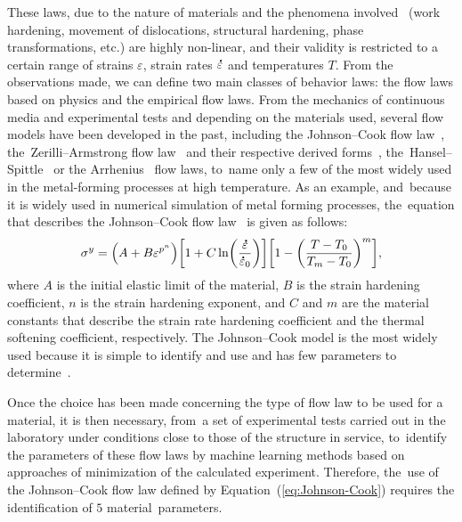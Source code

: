 \documentclass[algorithms,article,accept,pdftex,oneauthors]{Definitions/mdpi}
\DeclareRobustCommand{\mdot}[1]{\accentset{\mbox{\bfseries .}}{#1}}
\begin{document}
These laws, due to the nature of materials and the phenomena involved~\cite{Lennon-2004, Zhang-2012} (work hardening, movement of dislocations, structural hardening, phase transformations, etc.) are highly non-linear, and their validity is restricted to a certain range of strains $\varepsilon$, strain rates $\mdot\varepsilon$ and temperatures $T$.
From the observations made, we can define two main classes of behavior laws: the flow laws based on physics and the empirical flow laws.
From the mechanics of continuous media and experimental tests and depending on the materials used, several flow models have been developed in the past, including the Johnson--Cook flow law~\cite{Johnson-1983, Johnson-1988}, the~Zerilli--Armstrong flow law~\cite{Zerilli-1987} and their respective derived \mbox{forms~\cite{Lin-2011, Li-2013, Zhang-2015, Zhou-2020, Jia-2021, Rule-1998, Lin2010, Muralli-2017, Cheng-2021}}, the~Hansel--Spittle~\cite{Hensel-1978, Chadha-2018} or the Arrhenius~\cite{Jonas-1969, He-2013, Liang-2022} flow laws, to~name only a few of the most widely used in the metal-forming processes at high temperature.
As an example, and~because it is widely used in numerical simulation of metal forming processes, the~equation that describes the Johnson--Cook flow law~\cite{Johnson-1983} is given as follows:
\begin{equation}
\sigma^y=\left(A+B\varepsilon^{p^{n}}\right) \left[1+C\ln\left(\frac{\mdot\varepsilon}{\mdot\varepsilon_0}\right)\right] \left[1-\left(\frac{T-T_0}{T_m-T_0}\right)^{m}\right],\label{eq:Johnson-Cook}
\end{equation}
where $A$ is the initial elastic limit of the material, $B$ is the strain hardening coefficient, $n$ is the strain hardening exponent, and $C$ and $m$ are the material constants that describe the strain rate hardening coefficient and the thermal softening coefficient, respectively.
The Johnson--Cook model is the most widely used because it is simple to identify and use and has few parameters to determine~\cite{NematNasser-2003, Khan-2004}.

Once the choice has been made concerning the type of flow law to be used for a material, it is then necessary, from~a set of experimental tests carried out in the laboratory under conditions close to those of the structure in service, to~identify the parameters of these flow laws by machine learning methods based on approaches of minimization of the calculated experiment.
Therefore, the~use of the Johnson--Cook flow law defined by Equation~(\ref{eq:Johnson-Cook}) requires the identification of $5$ material~parameters.
\end{document}
